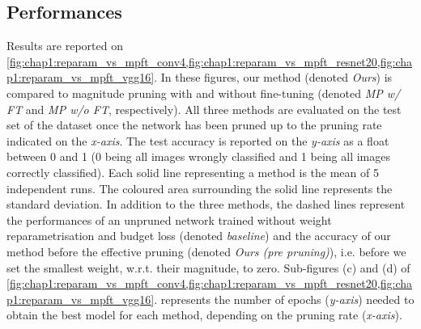 \subsection{Performances}\label{sec:chap1:performances}

Results are reported on
\cref{fig:chap1:reparam_vs_mpft_conv4,fig:chap1:reparam_vs_mpft_resnet20,fig:chap1:reparam_vs_mpft_vgg16}.
In these figures, our method (denoted \emph{Ours}) is compared to magnitude
pruning with and without fine-tuning (denoted \emph{MP w/ FT} and \emph{MP w/o
  FT}, respectively). All three methods are evaluated on the test set of the
dataset once the network has been pruned up to the pruning rate indicated on the
\emph{x-axis}. The test accuracy is reported on the \emph{y-axis} as a float
between 0 and 1 (0 being all images wrongly classified and 1 being all images
correctly classified). Each solid line representing a method is the mean of 5
independent runs. The coloured area surrounding the solid line represents the
standard deviation. In addition to the three methods, the dashed lines represent
the performances of an unpruned network trained without weight reparametrisation
and budget loss (denoted \emph{baseline}) and the accuracy of our method before
the effective pruning (denoted \emph{Ours (pre pruning)}), i.e. before we set
the smallest weight, w.r.t. their magnitude, to zero. Sub-figures (c) and (d) of
\cref{fig:chap1:reparam_vs_mpft_conv4,fig:chap1:reparam_vs_mpft_resnet20,fig:chap1:reparam_vs_mpft_vgg16}.
represents the number of epochs (\emph{y-axis}) needed to obtain the best model
for each method, depending on the pruning rate (\emph{x-axis}).\\


